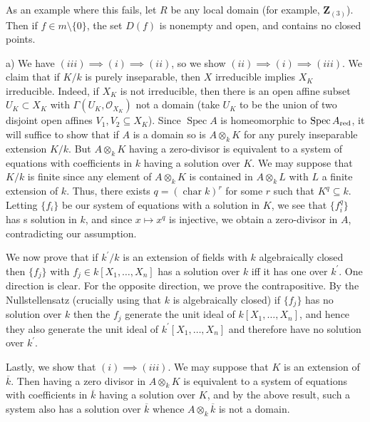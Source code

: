 \documentclass{report}
\renewcommand{\O}{\mathcal{O}}
\newcommand{\Z}{\mathbf{Z}}
\DeclareMathOperator{\Spec}{Spec}
\DeclareMathOperator{\Char}{char}
\begin{document}
As an example where this fails, let $R$ be any local domain (for example, $\Z_{(3)}$).
Then if $f\in m\setminus \{0\}$, the set $D(f)$ is nonempty and open, and contains
no closed points.

\bigskip
{}	a)	We have $(iii)\implies (i)\implies (ii)$, so we show $(ii)\implies (i)\implies (iii)$.
We claim that if $K/k$ is purely inseparable, then $X$ irreducible implies $X_K$ irreducible.
Indeed, if $X_K$ is not irreducible, then there is an open affine subset $U_K\subset X_K$
with $\Gamma(U_K,\O_{X_K})$ not a domain (take $U_K$ to be the union of two disjoint open affines $V_1,V_2\subseteq X_K$). 
Since $\Spec A$ is homeomorphic to $\Spec A_{\rm red}$, it will suffice to show that
if $A$ is a domain so is $A\otimes_k K$ for any purely inseparable extension $K/k$.
But $A\otimes_k K$ having a zero-divisor is equivalent to a system of equations with coefficients
in $k$ having a solution over $K$.	We may suppose that $K/k$ is finite since any element
of $A\otimes_k K$ is contained in $A\otimes_k L$ with $L$ a finite extension of $k$.  Thus, there
exists $q=(\Char k)^r$ for some $r$ such that $K^q\subseteq k$.  Letting $\{f_i\}$ be our
system of equations with a solution in $K$, we see that $\{f_i^q\}$ has s solution in $k$, and
since $x\mapsto x^q$ is injective, we obtain a zero-divisor in $A$, contradicting our assumption.

We now prove that
if $k^{\prime}/k$ is an extension of fields with $k$ algebraically closed then $\{f_j\}$ with $f_j\in k[X_1,\ldots, X_n]$
has a solution over $k$ iff it has one over $k^{\prime}$.  One direction is clear.  For the opposite direction,
we prove the contrapositive.  By the Nullstellensatz (crucially using that $k$ is algebraically closed)
if $\{f_j\}$ has no solution over $k$ then the $f_j$ generate the unit ideal  
of $k[X_1,\ldots,X_n]$, and hence they also generate the unit ideal of $k^{\prime}[X_1,\ldots,X_n]$
and therefore have no solution over $k^{\prime}$.

Lastly, we show that $(i)\implies (iii)$.  We may suppose that $K$ is an extension of $\overline{k}$.
Then having a zero divisor in $A\otimes_k K$ is equivalent to a system of equations with coefficients in $\overline{k}$
having a solution over $K$, and by the above result, such a system also has a solution over $\overline{k}$
whence $A\otimes_k \overline{k}$ is not a domain.
	 
	 
\end{document}
